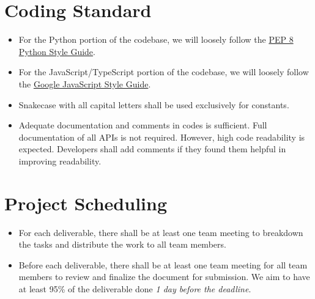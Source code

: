 \documentclass{article}
\begin{document}
\section{Coding Standard}

\begin{itemize}
\item For the Python portion of the codebase, we will loosely follow the
  \href{https://peps.python.org/pep-0008/}{PEP 8 Python Style Guide}.
\item For the JavaScript/TypeScript portion of the codebase, we will loosely follow
  the \href{https://google.GitHub.io/styleguide/jsguide.html}{Google JavaScript
    Style Guide}.
\item Snakecase with all capital letters shall be used exclusively for constants.
\item Adequate documentation and comments in codes is sufficient. Full
  documentation of all APIs is not required. However, high code readability is
  expected. Developers shall add comments if they found them helpful in
  improving readability.
\end{itemize}

\section{Project Scheduling}

\begin{itemize}
\item For each deliverable, there shall be at least one team meeting to breakdown
  the tasks and distribute the work to all team members.
\item Before each deliverable, there shall be at least one team meeting for all
  team members to review and finalize the document for submission. We aim to
  have at least 95\% of the deliverable done \emph{1 day before the deadline}.
\end{itemize}
\end{document}

